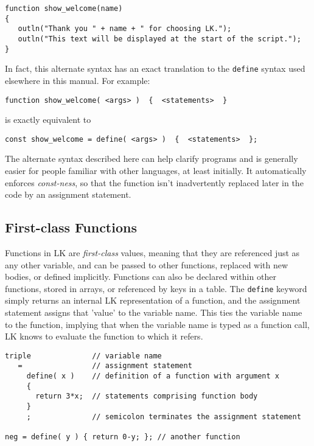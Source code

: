 \documentclass{article}
\begin{document}
\begin{verbatim}
function show_welcome(name)
{
   outln("Thank you " + name + " for choosing LK.");
   outln("This text will be displayed at the start of the script.");
}
\end{verbatim}

In fact, this alternate syntax has an exact translation to the \texttt{define} syntax used elsewhere in this manual.  For example:

\begin{verbatim}
function show_welcome( <args> )  {  <statements>  }
\end{verbatim}
is exactly equivalent to
\begin{verbatim}
const show_welcome = define( <args> )  {  <statements>  };
\end{verbatim}

The alternate syntax described here can help clarify programs and is generally easier for people familiar with other languages, at least initially.  It automatically enforces \emph{const-ness}, so that the function isn't inadvertently replaced later in the code by an assignment statement.



\subsection{First-class Functions}

Functions in LK are \emph{first-class} values, meaning that they are referenced just as any other variable, and can be passed to other functions, replaced with new bodies, or defined implicitly.  Functions can also be declared within other functions, stored in arrays, or referenced by keys in a table.  The \texttt{define} keyword simply returns an internal LK representation of a function, and the assignment statement assigns that 'value' to the variable name.  This ties the variable name to the function, implying that when the variable name is typed as a function call, LK knows to evaluate the function to which it refers.

\begin{verbatim}
triple              // variable name
   =                // assignment statement
     define( x )    // definition of a function with argument x
     {              
       return 3*x;  // statements comprising function body
     }        
     ;              // semicolon terminates the assignment statement
     
neg = define( y ) { return 0-y; }; // another function
\end{verbatim}
\end{document}
